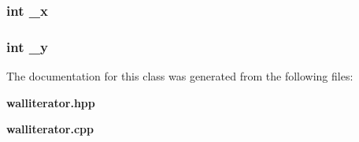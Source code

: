 \subsubsection{\setlength{\rightskip}{0pt plus 5cm}int {\bf \_\-x}\hspace{0.3cm}{\tt  [protected]}}\label{classWallIterator_p2}


\subsubsection{\setlength{\rightskip}{0pt plus 5cm}int {\bf \_\-y}\hspace{0.3cm}{\tt  [protected]}}\label{classWallIterator_p3}




The documentation for this class was generated from the following files:\begin{CompactItemize}
\item 
{\bf walliterator.hpp}\item 
{\bf walliterator.cpp}\end{CompactItemize}
